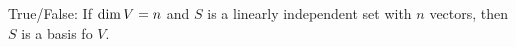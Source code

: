 \documentclass{ximera}
\def\dim{\mathop{\rm dim}}
\begin{document}
           \begin{question} True/False: If $\dim V= n$ and $S$ is a linearly independent set with $n$ vectors, then $S$ is a basis fo $V$.\\
           	
           	\begin{multipleChoice}
           	\end{multipleChoice}
           	
           	\end{question}
  
\end{document}
